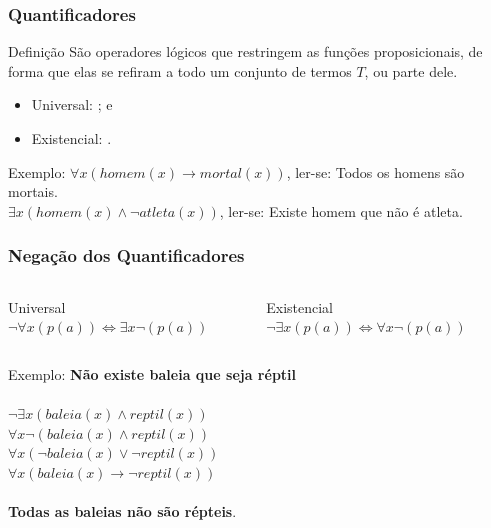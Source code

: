 \documentclass[aspectratio=169]{beamer} %
\begin{document}
\begin{frame}
\frametitle{Quantificadores}

\begin{block}{Definição}
São operadores lógicos que restringem as funções proposicionais, de forma que elas se refiram a todo um conjunto de termos $T$, ou parte dele.
\end{block}\vfill

\begin{itemize}
	\item Universal: \structure{$\forall$}; e
	\item Existencial: \structure{$\exists$}.
\end{itemize}\vfill

\begin{exampleblock}{Exemplo:}
$\forall x(homem(x) \rightarrow mortal(x))$, ler-se: Todos os homens são mortais.\\
$\exists x(homem(x) \wedge \neg atleta(x))$, ler-se: Existe homem que não é atleta.
\end{exampleblock}
\end{frame}

\begin{frame}
\frametitle{Negação dos Quantificadores}

\begin{columns}[c]
	\large
	\begin{block}{Universal}
		$\neg \forall x(p(a)) \Leftrightarrow \exists x \neg (p(a))$
	\end{block}
	
	\begin{block}{Existencial}
		$\neg \exists x(p(a)) \Leftrightarrow \forall x \neg(p(a))$
	\end{block}
\end{columns}\vfill

\begin{exampleblock}{Exemplo:}
	\textbf{Não existe baleia que seja réptil}\\~\\
	
	$\neg \exists x(baleia(x) \wedge reptil(x))$ \\
	$\forall x \neg(baleia(x) \wedge reptil(x))$ \\
	$\forall x(\neg baleia(x) \vee \neg reptil(x))$ \\
	$\forall x(baleia(x) \rightarrow \neg reptil(x))$ \\~\\
	
	\textbf{Todas as baleias não são répteis}.
\end{exampleblock}
\end{frame}
\end{document}
